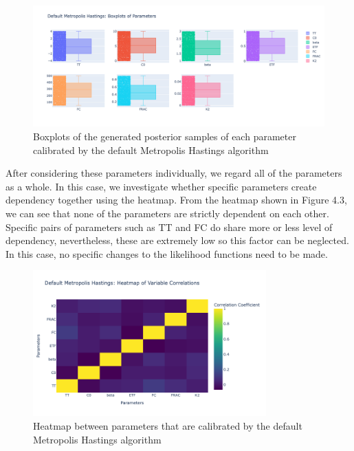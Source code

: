 \begin{figure}[H]
    \centering
    \includegraphics[width=1\textwidth]{figures/basic_mh/default_mh/default_mh_boxplot.png}
    \captionsetup{width=.8\textwidth}
    \caption{Boxplots of the generated posterior samples of each parameter calibrated by the default Metropolis Hastings algorithm}
    \label{fig:enter-label}
\end{figure}



After considering these parameters individually, we regard all of the parameters as a whole. In this case, we investigate whether specific parameters create dependency together using the heatmap. From the heatmap shown in Figure 4.3, we can see that none of the parameters are strictly dependent on each other. Specific pairs of parameters such as TT and FC do share more or less level of dependency, nevertheless, these are extremely low so this factor can be neglected. In this case, no specific changes to the likelihood functions need to be made.


\begin{figure}[H]
    \centering
    \includegraphics[width=0.8\textwidth]{figures/basic_mh/default_mh/default_mh_heatmap.png}
    \captionsetup{width=.8\textwidth}
    \caption{Heatmap between parameters that are calibrated by the default Metropolis Hastings algorithm}
    \label{fig:enter-label}
\end{figure}


